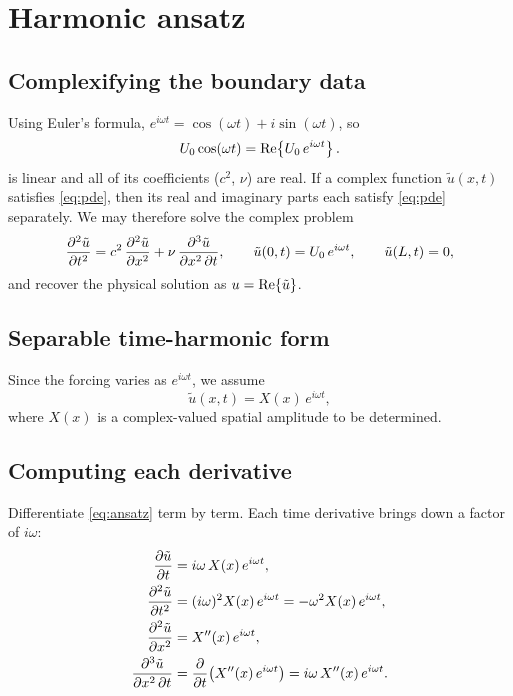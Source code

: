 \section{Harmonic ansatz}

\subsection{Complexifying the boundary data}

Using Euler's formula, $e^{i\omega t} = \cos(\omega t) + i\sin(\omega t)$, so
\begin{equation}
  U_0\cos(\omega t) = \operatorname{Re}\!\left\{ U_0\, e^{i\omega t} \right\}.
  \label{eq:euler_bc}
\end{equation}
 is linear and all of its coefficients ($c^2$, $\nu$) are
real. If a complex function $\tilde u(x,t)$ satisfies \cref{eq:pde}, then its
real and imaginary parts each satisfy \cref{eq:pde} separately. We may
therefore solve the complex problem
\begin{equation}
  \frac{\partial^2 \tilde u}{\partial t^2} = c^2\,\frac{\partial^2 \tilde u}{\partial x^2} + \nu\,\frac{\partial^3 \tilde u}{\partial x^2\,\partial t},
  \qquad
  \tilde u(0,t) = U_0\, e^{i\omega t},
  \qquad
  \tilde u(L,t) = 0,
  \label{eq:complex_problem}
\end{equation}
and recover the physical solution as $u = \operatorname{Re}\{\tilde u\}$.

\subsection{Separable time-harmonic form}

Since the forcing varies as $e^{i\omega t}$, we assume
\begin{equation}
  \tilde u(x,t) = X(x)\, e^{i\omega t},
  \label{eq:ansatz}
\end{equation}
where $X(x)$ is a complex-valued spatial amplitude to be determined.

\subsection{Computing each derivative}

Differentiate \cref{eq:ansatz} term by term. Each time derivative brings down a
factor of $i\omega$:
\begin{align}
  \frac{\partial \tilde u}{\partial t} &= i\omega\, X(x)\, e^{i\omega t}, \\
  \frac{\partial^2 \tilde u}{\partial t^2} &= (i\omega)^2 X(x)\, e^{i\omega t} = -\omega^2 X(x)\, e^{i\omega t}, \label{eq:utt}\\
  \frac{\partial^2 \tilde u}{\partial x^2} &= X''(x)\, e^{i\omega t}, \label{eq:uxx}\\
  \frac{\partial^3 \tilde u}{\partial x^2\,\partial t}
    &= \frac{\partial }{\partial t}\!\left( X''(x)\, e^{i\omega t} \right)
     = i\omega\, X''(x)\, e^{i\omega t}. \label{eq:uxxt}
\end{align}
